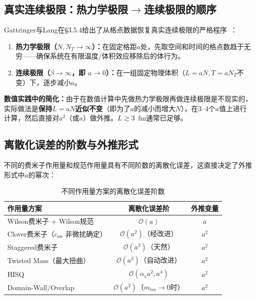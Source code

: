 \documentclass[12pt,a4paper]{ctexart}
\theoremstyle{definition}
\begin{document}
\subsection{真实连续极限：热力学极限$\to$连续极限的顺序}

Gattringer与Lang在§3.5.4给出了从格点数据恢复真实连续极限的严格程序~\cite{GattringerLang2010}：

\begin{enumerate}[leftmargin=*]
    \item \textbf{热力学极限（$N, N_T \to \infty$）：}在固定格距$a$处，先取空间和时间的格点数趋于无穷——确保系统在有限温度/体积效应移除后的体行为。
    \item \textbf{连续极限（$\beta \to \infty$，即 $a \to 0$）：}在一组固定物理体积（$L = aN, T = aN_T$不变）下，逐步减小$a$。
\end{enumerate}

\textbf{数值实践中的简化：}由于在数值计算中先做热力学极限再做连续极限是不现实的，实际做法是\textbf{保持$L = aN$近似不变}（即为了$a$的减小而增大$N$），在3--4个$a$值上进行计算，然后直接对$a^2$（或$a$）做外推。$L \gtrsim 3$~fm通常已足够。

\subsection{离散化误差的阶数与外推形式}

不同的费米子作用量和规范作用量具有不同阶数的离散化误差，这直接决定了外推形式中$a$的幂次：

\begin{table}[H]
\centering
\caption{不同作用量方案的离散化误差阶数}
\label{tab:disc_errors}
\begin{tabular}{lcc}
\toprule
作用量方案 & 离散化误差阶 & 外推变量 \\
\midrule
Wilson费米子 + Wilson规范 & $\mathcal{O}(a)$ & $a$ \\
Clover费米子（$c_{\text{sw}}$ 非微扰确定） & $\mathcal{O}(a^2)$（经改进） & $a^2$ \\
Staggered费米子 & $\mathcal{O}(a^2)$（天然） & $a^2$ \\
Twisted Mass（最大扭曲） & $\mathcal{O}(a^2)$（自动改进） & $a^2$ \\
HISQ & $\mathcal{O}(\alpha_s a^2, a^4)$ & $a^2$ \\
Domain-Wall/Overlap & $\mathcal{O}(a^2)$（$m_{\text{res}}\to 0$时） & $a^2$ \\
\bottomrule
\end{tabular}
\end{table}
\end{document}

